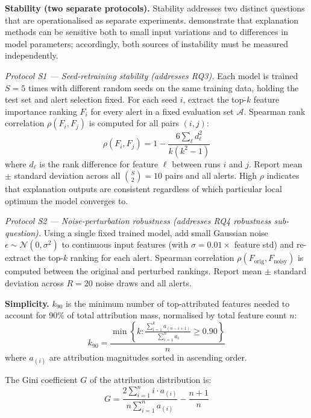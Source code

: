 \documentclass[12pt,a4paper]{report}
\begin{document}
\vspace{1em}
\noindent\textbf{Stability (two separate protocols).} Stability addresses two distinct questions that are operationalised as separate experiments. \citet{alvarez2018} demonstrate that explanation methods can be sensitive both to small input variations and to differences in model parameters; accordingly, both sources of instability must be measured independently.

\noindent\textit{Protocol S1 --- Seed-retraining stability (addresses RQ3).} Each model is trained $S = 5$ times with different random seeds on the same training data, holding the test set and alert selection fixed. For each seed $i$, extract the top-$k$ feature importance ranking $F_i$ for every alert in a fixed evaluation set $\mathcal{A}$. Spearman rank correlation $\rho(F_i, F_j)$ is computed for all pairs $(i, j)$:
\begin{equation}
\rho(F_i, F_j) = 1 - \frac{6 \sum_\ell d_\ell^2}{k(k^2 - 1)}
\end{equation}
where $d_\ell$ is the rank difference for feature $\ell$ between runs $i$ and $j$. Report mean $\pm$ standard deviation across all $\binom{S}{2} = 10$ pairs and all alerts. High $\rho$ indicates that explanation outputs are consistent regardless of which particular local optimum the model converges to.

\noindent\textit{Protocol S2 --- Noise-perturbation robustness (addresses RQ4 robustness sub-question).} Using a single fixed trained model, add small Gaussian noise $\epsilon \sim \mathcal{N}(0, \sigma^2)$ to continuous input features (with $\sigma = 0.01 \times$ feature std) and re-extract the top-$k$ ranking for each alert. Spearman correlation $\rho(F_{\text{orig}}, F_{\text{noisy}})$ is computed between the original and perturbed rankings. Report mean $\pm$ standard deviation across $R = 20$ noise draws and all alerts.

\vspace{1em}
\noindent\textbf{Simplicity.} $k_{90}$ is the minimum number of top-attributed features needed to account for 90\% of total attribution mass, normalised by total feature count $n$:
\begin{equation}
k_{90} = \frac{\min \left\{ k : \frac{\sum_{i=1}^{k} a_{(n-i+1)}}{\sum_{i=1}^{n} a_i} \geq 0.90 \right\}}{n}
\end{equation}
where $a_{(i)}$ are attribution magnitudes sorted in ascending order.

The Gini coefficient $G$ of the attribution distribution is:
\begin{equation}
G = \frac{2 \sum_{i=1}^{n} i \cdot a_{(i)}}{n \sum_{i=1}^{n} a_{(i)}} - \frac{n + 1}{n}
\end{equation}
\end{document}
